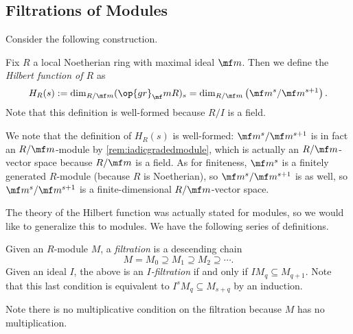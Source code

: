 \subsection{Filtrations of Modules}
Consider the following construction.
\begin{defi} \label{def:hilbfuncring}
	Fix $R$ a local Noetherian ring with maximal ideal $\mf m$. Then we define the \textit{Hilbert function of $R$} as
	\[H_R(s):=\dim_{R/\mf m}(\op{gr}_\mf mR)_s=\dim_{R/\mf m}\left(\mf m^s/\mf m^{s+1}\right).\]
	Note that this definition is well-formed because $R/I$ is a field.
\end{defi}
We note that the definition of $H_R(s)$ is well-formed: $\mf m^s/\mf m^{s+1}$ is in fact an $R/\mf m$-module by \autoref{rem:iadicgradedmodule}, which is actually an $R/\mf m$-vector space because $R/\mf m$ is a field. As for finiteness, $\mf m^s$ is a finitely generated $R$-module (because $R$ is Noetherian), so $\mf m^s/\mf m^{s+1}$ is as well, so $\mf m^s/\mf m^{s+1}$ is a finite-dimensional $R/\mf m$-vector space.

The theory of the Hilbert function was actually stated for modules, so we would like to generalize this to modules. We have the following series of definitions.
\begin{definition}
	Given an $R$-module $M$, a \textit{filtration} is a descending chain
	\[M=M_0\supseteq M_1\supseteq M_2\supseteq\cdots.\]
	Given an ideal $I$, the above is an \textit{$I$-filtration} if and only if $IM_q\subseteq M_{q+1}$. Note that this last condition is equivalent to $I^sM_q\subseteq M_{s+q}$ by an induction.
\end{definition}
Note there is no multiplicative condition on the filtration because $M$ has no multiplication.

